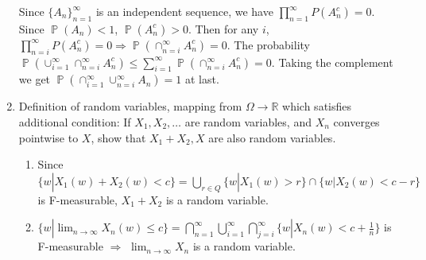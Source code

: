 \documentclass{article}
\DeclareMathOperator{\bP}{\mathbb{P}}
\begin{document}
\begin{enumerate}
Since $\{A_n\}_{n=1}^{\infty}$
is an independent sequence,
we have $\prod_{n=1}^{\infty} P(A_n^c)=0$.
Since $\bP(A_n)<1$, $\bP(A_n^c)>0$. Then for any $i$,
$\prod_{n=i}^{\infty} P(A_n^c)=0 \Rightarrow \bP(\cap_{n=i}^{\infty} A_n^c) = 0$.
The probability
$\bP(\cup_{i=1}^{\infty}\cap_{n=i}^{\infty}A_n^c) 
\leq \sum_{i=1}^{\infty} \bP(\cap_{n=i}^{\infty}A_n^c)
= 0$. Taking the complement we get $\bP(\cap_{i=1}^{\infty} \cup_{n=i}^{\infty} A_n ) 
=1$ at last.
    \item Definition of random variables, mapping from $\Omega \to \mathbb{R}$
    which satisfies additional condition: If $X_1, X_2, \dots $ are random variables, and $X_n$ converges pointwise to $X$, show that $X_1 + X_2,
    X$ are also random variables.
    \begin{enumerate}
    \item Since $\{w | X_1(w) + X_2(w) < c\}=\bigcup_{r\in Q}
    \{w|X_1(w) > r\} \cap \{w|X_2(w) < c-r\}$ is F-measurable,
    $X_1+X_2$ is a random variable.
    \item $\{w|\lim_{n\to \infty} X_n(w) \leq c\} = \bigcap_{n=1}^{\infty} \bigcup_{i=1}^{\infty} \bigcap_{j=i}^{\infty} \{w|X_n(w) < c + \frac{1}{n}\}$
    is F-measurable $\Rightarrow$ $\lim_{n\to\infty} X_n$
    is a random variable.
\end{enumerate}
\end{enumerate}
\end{document}
